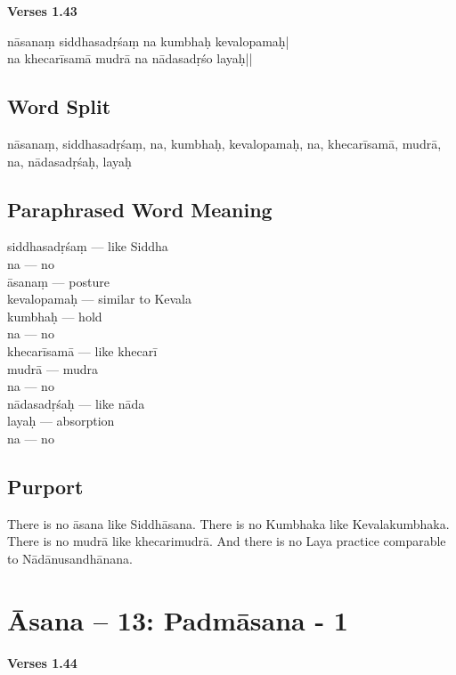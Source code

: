 \newpage
\noindent \textbf{Verses 1.43}

\begin{shloka}
nāsanaṃ siddhasadṛśaṃ na kumbhaḥ kevalopamaḥ|\\
na khecarīsamā mudrā na nādasadṛśo layaḥ||
\end{shloka}

\subsection*{Word Split}

nāsanaṃ, siddhasadṛśaṃ, na, kumbhaḥ, kevalopamaḥ, na, khecarīsamā, mudrā, na, nādasadṛśaḥ, layaḥ 

\subsection*{Paraphrased Word Meaning}

\begin{multicols}{2}
\itemsep=0pt
siddhasadṛśaṃ --- like Siddha \\
na --- no \\
āsanaṃ --- posture  \\
kevalopamaḥ --- similar to Kevala  \\
kumbhaḥ ---  hold  \\
na --- no \\
khecarīsamā --- like khecarī   \\
mudrā --- mudra \\
na ---  no	 \\		
nādasadṛśaḥ --- like nāda	 \\
layaḥ --- absorption  \\
na --- no
\end{multicols}

\subsection*{Purport}

There is no āsana like Siddhāsana. There is no Kumbhaka like Kevalakumbhaka. There is no mudrā like khecarimudrā. And there is no Laya practice comparable to Nādānusandhānana.
\newpage

\section*{Āsana -- 13: Padmāsana - 1}

\noindent \textbf{Verses 1.44}

